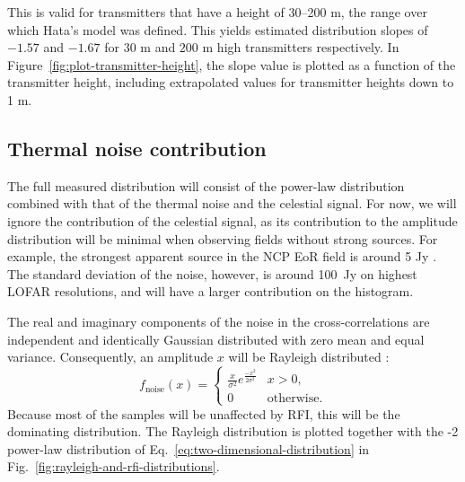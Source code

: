 \documentclass[useAMS,usenatbib]{mn2e}
\newcommand{\editmark}[1]{{\color{red}{\textbf{#1}}}}
\begin{document}
This is valid for transmitters that have a height of 30--200 m, the range over which Hata's model was defined. This yields estimated distribution slopes of $-1.57$ and $-1.67$ for $30$ m and $200$ m high transmitters respectively. In Figure~\ref{fig:plot-transmitter-height}, the slope value is plotted as a function of the transmitter height, including extrapolated values for transmitter heights down to 1 m.

\subsection{Thermal noise contribution} \label{sec:histogram-noise}
The full measured distribution will consist of the power-law distribution combined with that of the thermal noise and the celestial signal. For now, we will ignore the contribution of the celestial signal, as its contribution to the amplitude distribution will be minimal when observing fields without strong \editmark{celestial} sources. For example, the strongest apparent \editmark{celestial} source in the NCP EoR field is around 5 Jy \citep{ncp-eor-yatawatta}.
The standard deviation of the noise, however, is around 100~Jy on highest LOFAR resolutions, and will have a larger contribution on the histogram.

The real and imaginary components of the noise in the cross-correlations are independent and identically Gaussian distributed with zero mean and equal variance. Consequently, an amplitude $x$ will be Rayleigh distributed \citep[\S6-2]{papoulis-stochastic-processes}: 
\begin{equation}\label{eq:rayleigh-formula}
f_\textrm{noise}(x) =
\begin{cases}
\frac{x}{\sigma^2} e^{\frac{-x^2}{2\sigma^2}} & x > 0, \\
0 & \textrm{otherwise.}
\end{cases}
\end{equation}
Because most of the samples will be unaffected by RFI, this will be the dominating distribution. The Rayleigh distribution is plotted together with the -2 power-law distribution of Eq.~\eqref{eq:two-dimensional-distribution} in Fig.~\ref{fig:rayleigh-and-rfi-distributions}.
\end{document}
